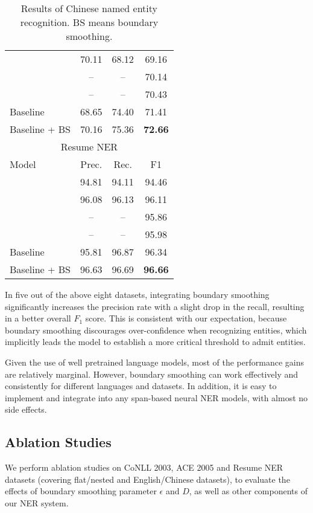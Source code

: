 \documentclass[11pt]{article}
\begin{document}
\begin{table}[!ht]
\begin{tabular}{lccc}
        \citet{shen-etal-2021-locate}   & 70.11 & 68.12 & 69.16 \\
        \citet{chen-kong-2021-enhancing} & -- & -- & 70.14 \\
        \citet{wu-etal-2021-mect}       & -- & -- & 70.43 \\
        Baseline          & 68.65 & 74.40 & 71.41 \\
        Baseline + BS     & 70.16 & 75.36 & \textbf{72.66} \\
        \bottomrule
        \toprule
        \multicolumn{4}{c}{Resume NER} \\
        \midrule
        Model & Prec. & Rec. & F1 \\
        \midrule
        \citet{zhang-yang-2018-chinese} & 94.81 & 94.11 & 94.46 \\
        \citet{ma-etal-2020-simplify}   & 96.08 & 96.13 & 96.11 \\
        \citet{li-etal-2020-flat}       & -- & -- & 95.86 \\
        \citet{wu-etal-2021-mect}       & -- & -- & 95.98 \\
        Baseline          & 95.81 & 96.87 & 96.34 \\
        Baseline + BS     & 96.63 & 96.69 & \textbf{96.66} \\
        \bottomrule
    \end{tabular}
    \caption{Results of Chinese named entity recognition. BS means boundary smoothing.}
    \label{tab:chinese-res}
\end{table}


In five out of the above eight datasets, integrating boundary smoothing significantly increases the precision rate with a slight drop in the recall, resulting in a better overall $F_1$ score. This is consistent with our expectation, because boundary smoothing discourages over-confidence when recognizing entities, which implicitly leads the model to establish a more critical threshold to admit entities. 

Given the use of well pretrained language models, most of the performance gains are relatively marginal. However, boundary smoothing can work effectively and consistently for different languages and datasets. In addition, it is easy to implement and integrate into any span-based neural NER models, with almost no side effects. 


\subsection{Ablation Studies}
We perform ablation studies on CoNLL 2003, ACE 2005 and Resume NER datasets (covering flat/nested and English/Chinese datasets), to evaluate the effects of boundary smoothing parameter $\epsilon$ and $D$, as well as other components of our NER system. 
\end{document}
